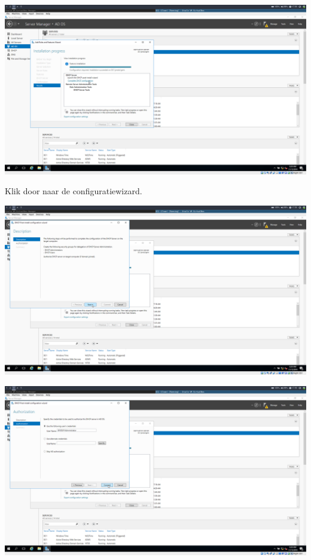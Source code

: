 \documentclass[a4paper]{article}
\begin{document}
\begin{center}
	\includegraphics[width=15cm]{Pictures/DC1/DHCP/1542299953.png}
	
	Klik door naar de configuratiewizard.
\end{center}
\begin{center}
	\includegraphics[width=15cm]{Pictures/DC1/DHCP/1542299964.png}
\end{center}
\begin{center}
	\includegraphics[width=15cm]{Pictures/DC1/DHCP/1542299973.png}
\end{center}
\end{document}
